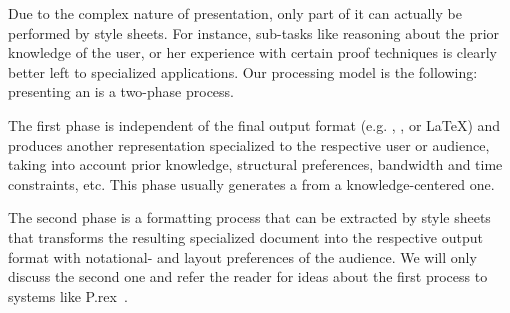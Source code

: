 \begin{omgroup}[id=transform-xsl,short=Transforming OMDoc]
Due to the complex nature of {\omdoc} presentation, only part of it can actually be
performed by {\xslt} style sheets. For instance, sub-tasks like reasoning about the prior
knowledge of the user, or her experience with certain proof techniques is clearly better
left to specialized applications. Our processing model is the following: presenting an
{\omdoc} is a two-phase process.

The first phase is independent of the final output format (e.g. {\html}, {\mathml}, or
{\LaTeX}) and produces another {\omdoc} representation specialized to the respective user
or audience, taking into account prior knowledge, structural preferences, bandwidth and
time constraints, etc.  This phase usually generates a
{} from a knowledge-centered
one. 

The second phase is a formatting process that can be extracted by {\xslt} style sheets
that transforms the resulting specialized document into the respective output format with
notational- and layout preferences of the audience. We will only discuss the second one
and refer the reader for ideas about the first process to systems like
P.rex~\cite{Fiedler:ddaoeo01,FiedlerHoracek:aietlp01}.


\end{omgroup}
